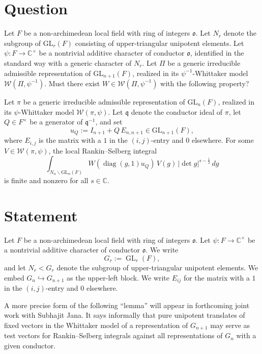 \documentclass[reqno]{amsart}
\theoremstyle{plain}
\theoremstyle{definition}
\begin{document}
\author{Paul D. Nelson}

\section{Question}
Let \(F\) be a non-archimedean local field with ring of integers \(\mathfrak o\).  Let $N_r$ denote the subgroup of $\mathrm{GL}_{r}(F)$ consisting of upper-triangular unipotent elements.  Let \(\psi:F\to \mathbb C^\times\) be a nontrivial additive character of conductor \(\mathfrak o\), identified in the standard way with a generic character of $N_r$.  Let \(\Pi\) be a generic irreducible admissible representation of \(\mathrm{GL}_{n + 1}(F)\), realized in its \(\psi^{-1}\)-Whittaker model \(\mathcal W(\Pi,\psi^{-1})\).  Must there exist \(W\in \mathcal W(\Pi,\psi^{-1})\) with the following property?

Let $\pi$ be a generic irreducible admissible representation of \(\mathrm{GL}_{n}(F)\), realized in its $\psi$-Whittaker model \(\mathcal W(\pi,\psi)\).  Let $\mathfrak{q}$ denote the conductor ideal of $\pi$, let \(Q\in F^\times\) be a generator of \(\mathfrak q^{-1}\), and set
\[
  u_Q := I_{n+1} + Q\,E_{n,n+1} \in \mathrm{GL}_{n + 1}(F),
\]
where \(E_{i, j}\) is the matrix with a \(1\) in the \((i, j)\)-entry and \(0\) elsewhere.  For some \(V\in \mathcal W(\pi,\psi)\), the local Rankin--Selberg integral
\[
  \int_{N_n\backslash \mathrm{GL}_{n}(F)} W(\operatorname{diag}(g,1) u_Q)\,V(g)\,|\det g|^{s-\frac12}\,dg
\]
is finite and nonzero for all \(s\in\mathbb C\).

\section{Statement}

Let \(F\) be a non-archimedean local field with ring of integers \(\mathfrak o\). Let \(\psi:F\to \mathbb C^\times\) be a nontrivial additive character of conductor \(\mathfrak o\).  We write
\begin{equation*}
  G_r:=\operatorname{GL}_r(F),
\end{equation*}
and let \(N_r<G_r\) denote the subgroup of upper-triangular unipotent elements.  We embed \(G_n \hookrightarrow G_{n + 1}\) as the upper-left block.  We write \(E_{i j}\) for the matrix with a \(1\) in the \((i, j)\)-entry and \(0\) elsewhere.

A more precise form of the following ``lemma'' will appear in forthcoming joint work with Subhajit Jana.  It says informally that pure unipotent translates of fixed vectors in the Whittaker model of a representation of \(G_{n+1}\) may serve as test vectors for Rankin--Selberg integrals against all representations of \(G_n\) with a given conductor.
\end{document}
